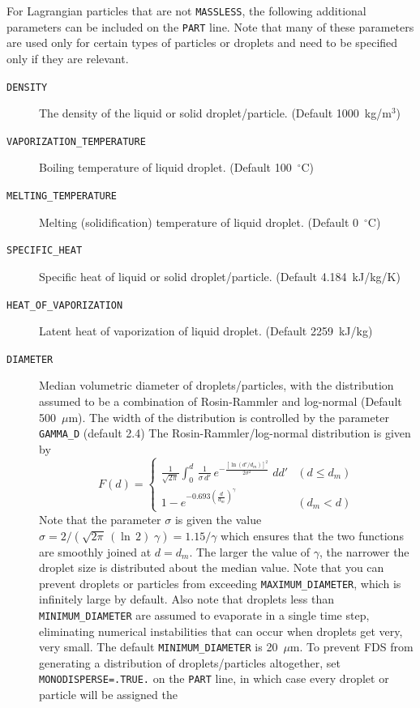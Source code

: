\documentclass[11pt]{book}
\newcommand{\ct}{\tt\small}
\newcommand{\be}{\begin{equation}}
\newcommand{\ee}{\end{equation}}
\begin{document}
For Lagrangian particles that are not {\ct MASSLESS}, the following additional parameters can be
included on the {\ct PART} line. Note that
many of these parameters are used only for certain types of particles or
droplets and need to be specified only if they are relevant.
\begin{description}
\item[{\ct DENSITY}] The density of the liquid or solid droplet/particle.
(Default 1000~kg/m$^3$)
\item[{\ct VAPORIZATION\_TEMPERATURE}] Boiling temperature of liquid droplet.
(Default 100~$^\circ$C)
\item[{\ct MELTING\_TEMPERATURE}] Melting (solidification) temperature of liquid droplet.
(Default 0~$^\circ$C)
\item[{\ct SPECIFIC\_HEAT}] Specific heat of liquid or solid droplet/particle.
(Default 4.184~kJ/kg/K)
\item[{\ct HEAT\_OF\_VAPORIZATION}] Latent heat of vaporization of liquid droplet.
(Default 2259~kJ/kg)
\item[{\ct DIAMETER}] Median volumetric diameter of droplets/particles, with the
distribution assumed to be a combination of Rosin-Rammler and log-normal (Default 500~$\mu$m). The
width of the distribution is controlled by the parameter {\ct GAMMA\_D} (default 2.4)
The Rosin-Rammler/log-normal distribution is given by
\be F(d) = \left\{ \begin{array}{ll}
   \frac{1}{\sqrt{2\pi}} {\displaystyle \int_0^d} \, \frac{1}{\sigma\, d'} \,
   e^{-\frac{[\ln(d'/d_m)]^2}{2\sigma^2}} \; dd'       & (d \le d_m) \\
   1 - e^{-0.693 \left(\frac{d}{d_m}\right)^\gamma }  & (d_m < d)
   \end{array} \right.  \ee
Note that the parameter $\sigma$ is given the value
$\sigma=2/(\sqrt{2\pi} \, (\ln\,2) \; \gamma)=1.15/\gamma$
which ensures that the two functions are smoothly joined at $d=d_m$.
The larger the value of $\gamma$, the narrower the droplet size is
distributed about the median value. Note that you can prevent droplets or particles from
exceeding {\ct MAXIMUM\_DIAMETER}, which is infinitely large by default. Also note that
droplets less than {\ct MINIMUM\_DIAMETER} are assumed to evaporate in a single time step, eliminating numerical
instabilities that can occur when droplets get very, very small. The default {\ct MINIMUM\_DIAMETER} is 20~$\mu$m.
To prevent FDS from generating a distribution of droplets/particles altogether, set
{\ct MONODISPERSE=.TRUE.} on the {\ct PART} line, in which case every droplet or particle will be assigned the

\end{description}
\end{document}
